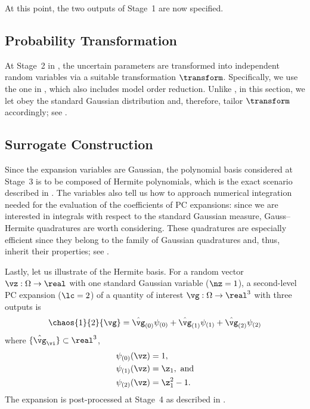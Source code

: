 At this point, the two outputs of Stage~1 are now specified.

\subsection{Probability Transformation}

At Stage~2 in , the uncertain parameters \vu are
transformed into independent random variables \vz via a suitable transformation
$\transform$. Specifically, we use the one in ,
which also includes model order reduction. Unlike
, in this section, we let \vz obey the
standard Gaussian distribution and, therefore, tailor $\transform$ accordingly;
see .

\subsection{Surrogate Construction}

Since the expansion variables \vz are Gaussian, the polynomial basis considered
at Stage~3 is to be composed of Hermite polynomials, which is the exact scenario
described in . The variables also tell us how to approach
numerical integration needed for the evaluation of the coefficients of \ac{PC}
expansions: since we are interested in integrals with respect to the standard
Gaussian measure, Gauss--Hermite quadratures \cite{maitre2010} are worth
considering. These quadratures are especially efficient since they belong to the
family of Gaussian quadratures and, thus, inherit their properties; see
.

Lastly, let us illustrate of the Hermite basis. For a random vector $\vz: \Omega
\to \real$ with one standard Gaussian variable ($\nz = 1$), a second-level
\ac{PC} expansion ($\lc = 2$) of a quantity of interest $\vg: \Omega \to
\real^3$ with three outputs is
\[
  \chaos{1}{2}{\vg}
  = \hat{\vg}_{(0)} \psi_{(0)}
  + \hat{\vg}_{(1)} \psi_{(1)}
  + \hat{\vg}_{(2)} \psi_{(2)}
\]
where $\{ \hat{\vg}_{\vi} \} \subset \real^3$,
\begin{align*}
  & \psi_{(0)}(\vz) = 1, \\
  & \psi_{(1)}(\vz) = \z_1, \text{ and} \\
  & \psi_{(2)}(\vz) = \z_1^2 - 1.
\end{align*}
The expansion is post-processed at Stage~4 as described in
.

